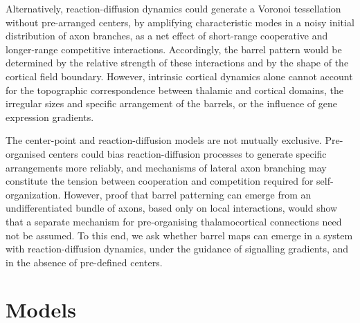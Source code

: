 \documentclass[9pt,twocolumn,twoside,lineno]{pnas-new}
\begin{document}
Alternatively, reaction-diffusion dynamics could generate a Voronoi
tessellation without pre-arranged centers, by amplifying characteristic modes
in a noisy initial distribution of axon branches, as a net effect of
short-range cooperative and longer-range competitive
interactions. Accordingly, the barrel pattern would be determined by the
relative strength of these interactions and by the shape of the cortical field
boundary. However, intrinsic cortical dynamics alone cannot account for the
topographic correspondence between thalamic and cortical domains, the
irregular sizes and specific arrangement of the barrels, or the influence of
gene expression gradients.

The center-point and reaction-diffusion models are not mutually
exclusive. Pre-organised centers could bias reaction-diffusion processes to
generate specific arrangements more reliably, and mechanisms of lateral axon
branching may constitute the tension between cooperation and competition
required for self-organization. However, proof that barrel patterning can
emerge from an undifferentiated bundle of axons, based only on local
interactions, would show that a separate mechanism for pre-organising
thalamocortical connections need not be assumed. To this end, we ask whether
barrel maps can emerge in a system with reaction-diffusion dynamics, under the
guidance of signalling gradients, and in the absence of pre-defined centers.


\section*{Models}
\end{document}
